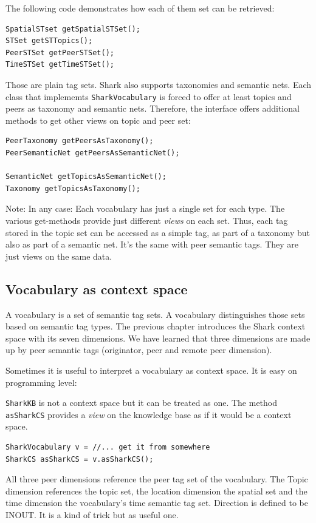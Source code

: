 The following code demonstrates how each of them set can be retrieved:

\begin{verbatim}
SpatialSTset getSpatialSTSet();
STSet getSTTopics();
PeerSTSet getPeerSTSet();
TimeSTSet getTimeSTSet();
\end{verbatim} 

Those are plain tag sets. Shark also supports taxonomies and semantic nets. Each class that implememts {\tt SharkVocabulary} is forced to offer at least topics and peers as taxonomy and semantic nets. Therefore, the interface offers additional methods to get other views on topic and peer set:

\begin{verbatim}
PeerTaxonomy getPeersAsTaxonomy();
PeerSemanticNet getPeersAsSemanticNet();

SemanticNet getTopicsAsSemanticNet();
Taxonomy getTopicsAsTaxonomy();
\end{verbatim}

Note: In any case: Each vocabulary has just a single set for each type. The various get-methods provide just different {\it views} on each set. Thus, each tag stored in the topic set can be accessed as a simple tag, as part of a taxonomy but also as part of a semantic net. It's the same with peer semantic tags. They are just views on the same data.

\subsection{Vocabulary as context space}
A vocabulary is a set of semantic tag sets. A vocabulary distinguishes those sets based on semantic tag types. The previous chapter introduces the Shark context space with its seven dimensions. We have learned that three dimensions are made up by peer semantic tags (originator, peer and remote peer dimension).

Sometimes it is useful to interpret a vocabulary as context space. It is easy on programming level:

{\tt SharkKB} is not a context space but it can be treated as one. The method {\tt asSharkCS} provides a {\it view} on the knowledge base as if it would be a context space.

\begin{verbatim}
SharkVocabulary v = //... get it from somewhere
SharkCS asSharkCS = v.asSharkCS();
\end{verbatim}

All three peer dimensions reference the peer tag set of the vocabulary. The Topic dimension references the topic set, the location dimension the spatial set and the time dimension the vocabulary's time semantic tag set. Direction is defined to be INOUT.
It is a kind of trick but as useful one.

